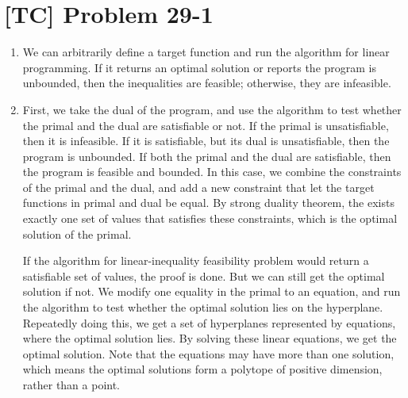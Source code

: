 \documentclass[a4paper,11pt,twocolumn]{article}
\begin{document}
  \section{[TC] Problem 29-1}
  \begin{enumerate}
    \item We can arbitrarily define a target function and run the algorithm for linear programming. If it returns an optimal solution or reports the program is unbounded, then the inequalities are feasible; otherwise, they are infeasible.
    \item First, we take the dual of the program, and use the algorithm to test whether the primal and the dual are satisfiable or not. If the primal is unsatisfiable, then it is infeasible. If it is satisfiable, but its dual is unsatisfiable, then the program is unbounded. If both the primal and the dual are satisfiable, then the program is feasible and bounded. In this case, we combine the constraints of the primal and the dual, and add a new constraint that let the target functions in primal and dual be equal. By strong duality theorem, the exists exactly one set of values that satisfies these constraints, which is the optimal solution of the primal. \par
        If the algorithm for linear-inequality feasibility problem would return a satisfiable set of values, the proof is done. But we can still get the optimal solution if not. We modify one equality in the primal to an equation, and run the algorithm to test whether the optimal solution lies on the hyperplane. Repeatedly doing this, we get a set of hyperplanes represented by equations, where the optimal solution lies. By solving these linear equations, we get the optimal solution. Note that the equations may have more than one solution, which means the optimal solutions form a polytope of positive dimension, rather than a point.
  \end{enumerate}
\end{document}
